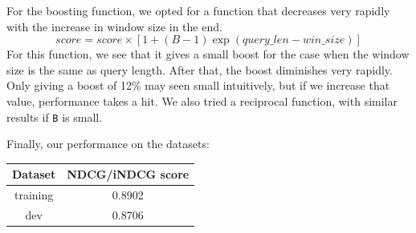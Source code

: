 \documentclass[10pt,twocolumn]{article}
\begin{document}
For the boosting function, we opted for a function that decreases very rapidly with the increase in window size in the end.
\begin{equation*}
score = score \times [1+(B-1)\exp(query\_len-win\_size)]
\end{equation*}
For this function, we see that it gives a small boost for the case when the window size is the same as query length. After that, the boost diminishes very rapidly. Only giving a boost of 12\% may seen small intuitively, but if we increase that value, performance takes a hit. We also tried a reciprocal function, with similar results if \texttt{B} is small.

Finally, our performance on the datasets:
\begin{table}[H]
\centering
\begin{tabular}{|c|c|}
\hline
Dataset & NDCG/iNDCG score \\\hline
training & 0.8902\\\hline
dev & 0.8706\\\hline
\end{tabular}
\end{table}
\end{document}
